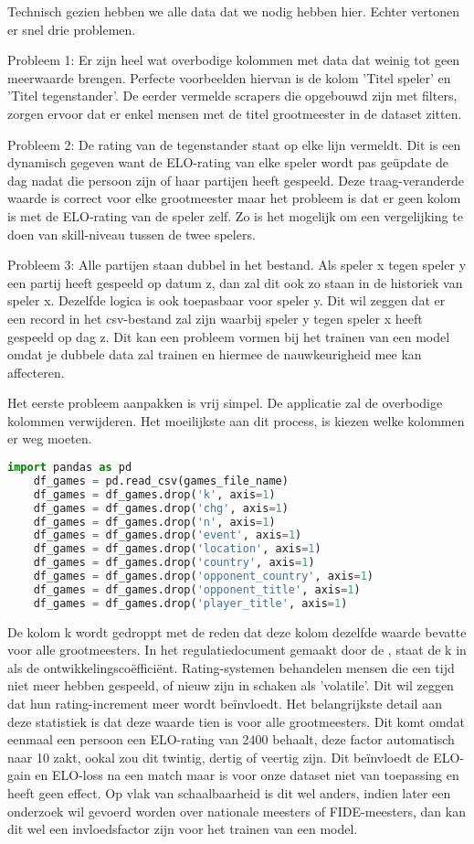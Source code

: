 Technisch gezien hebben we alle data dat we nodig hebben hier. Echter vertonen er snel drie problemen.

Probleem 1: Er zijn heel wat overbodige kolommen met data dat weinig tot geen meerwaarde brengen. Perfecte voorbeelden hiervan is de kolom 'Titel speler' en 'Titel tegenstander'. De eerder vermelde scrapers die opgebouwd zijn met filters, zorgen ervoor dat er enkel mensen met de titel grootmeester in de dataset zitten. 

Probleem 2: De rating van de tegenstander staat op elke lijn vermeldt. Dit is een dynamisch gegeven want de ELO-rating van elke speler wordt pas geüpdate de dag nadat die persoon zijn of haar partijen heeft gespeeld. Deze traag-veranderde waarde is correct voor elke grootmeester maar het probleem is dat er geen kolom is met de ELO-rating van de speler zelf. Zo is het mogelijk om een vergelijking te doen van skill-niveau tussen de twee spelers.

Probleem 3: Alle partijen staan dubbel in het bestand. Als speler x tegen speler y een partij heeft gespeeld op datum z, dan zal dit ook zo staan in de historiek van speler x. Dezelfde logica is ook toepasbaar voor speler y. Dit wil zeggen dat er een record in het csv-bestand zal zijn waarbij speler y tegen speler x heeft gespeeld op dag z. Dit kan een probleem vormen bij het trainen van een model omdat je dubbele data zal trainen en hiermee de nauwkeurigheid mee kan affecteren. 

Het eerste probleem aanpakken is vrij simpel. De applicatie zal de overbodige kolommen verwijderen. Het moeilijkste aan dit process, is kiezen welke kolommen er weg moeten.
\begin{lstlisting}[language=Python]
    import pandas as pd
    df_games = pd.read_csv(games_file_name)
    df_games = df_games.drop('k', axis=1)
    df_games = df_games.drop('chg', axis=1)
    df_games = df_games.drop('n', axis=1)
    df_games = df_games.drop('event', axis=1)
    df_games = df_games.drop('location', axis=1)
    df_games = df_games.drop('country', axis=1)
    df_games = df_games.drop('opponent_country', axis=1)
    df_games = df_games.drop('opponent_title', axis=1)
    df_games = df_games.drop('player_title', axis=1)
\end{lstlisting}

De kolom k wordt gedroppt met de reden dat deze kolom dezelfde waarde bevatte voor alle grootmeesters. In het regulatiedocument gemaakt door de \textcite{FIDE2021}, staat de k in als de ontwikkelingscoëfficiënt. Rating-systemen behandelen mensen die een tijd niet meer hebben gespeeld, of nieuw zijn in schaken als 'volatile'. Dit wil zeggen dat hun rating-increment meer wordt beïnvloedt. Het belangrijkste detail aan deze statistiek is dat deze waarde tien is voor alle grootmeesters. Dit komt omdat eenmaal een persoon een ELO-rating van 2400 behaalt, deze factor automatisch naar 10 zakt, ookal zou dit twintig, dertig of veertig zijn. Dit beïnvloedt de ELO-gain en ELO-loss na een match maar is voor onze dataset niet van toepassing en heeft geen effect. Op vlak van schaalbaarheid is dit wel anders, indien later een onderzoek wil gevoerd worden over nationale meesters of FIDE-meesters, dan kan dit wel een invloedsfactor zijn voor het trainen van een model. 

